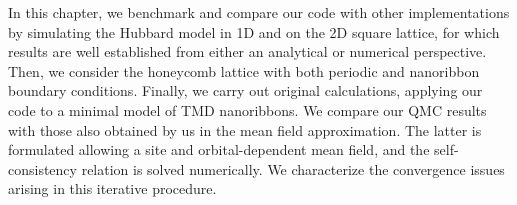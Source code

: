 
\label{cap:applications}

\slshape

In this chapter, we benchmark and compare our code with other implementations by simulating the Hubbard model in \acs{1D} and on the \acs{2D} square lattice, for which results are well established from either an analytical or numerical perspective.
Then, we consider the honeycomb lattice with both periodic and nanoribbon boundary conditions.
Finally, we carry out original calculations, applying our code to a minimal model of \acs{TMD} nanoribbons.
We compare our \acs{QMC} results with those also obtained by us in the mean field approximation.
The latter is formulated allowing a site and orbital-dependent mean field, and the self-consistency relation is solved numerically.
We characterize the convergence issues arising in this iterative procedure.

\normalfont





